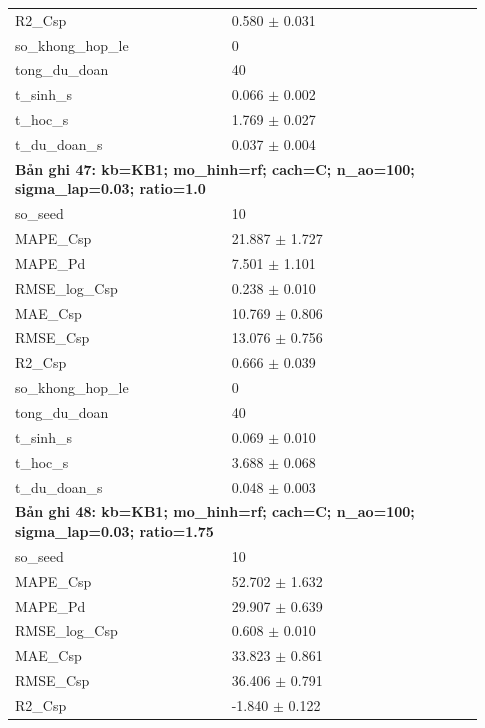 \begin{longtable}{p{0.43\linewidth}p{0.50\linewidth}}
R2\_\allowbreak Csp & 0.580 $\pm$ 0.031 \\
so\_\allowbreak khong\_\allowbreak hop\_\allowbreak le & 0 \\
tong\_\allowbreak du\_\allowbreak doan & 40 \\
t\_\allowbreak sinh\_\allowbreak s & 0.066 $\pm$ 0.002 \\
t\_\allowbreak hoc\_\allowbreak s & 1.769 $\pm$ 0.027 \\
t\_\allowbreak du\_\allowbreak doan\_\allowbreak s & 0.037 $\pm$ 0.004 \\
\midrule
\multicolumn{2}{p{0.95\linewidth}}{\textbf{Bản ghi 47: kb=KB1; mo\_hinh=rf; cach=C; n\_ao=100; sigma\_lap=0.03; ratio=1.0}} \\
so\_\allowbreak seed & 10 \\
MAPE\_\allowbreak Csp & 21.887 $\pm$ 1.727 \\
MAPE\_\allowbreak Pd & 7.501 $\pm$ 1.101 \\
RMSE\_\allowbreak log\_\allowbreak Csp & 0.238 $\pm$ 0.010 \\
MAE\_\allowbreak Csp & 10.769 $\pm$ 0.806 \\
RMSE\_\allowbreak Csp & 13.076 $\pm$ 0.756 \\
R2\_\allowbreak Csp & 0.666 $\pm$ 0.039 \\
so\_\allowbreak khong\_\allowbreak hop\_\allowbreak le & 0 \\
tong\_\allowbreak du\_\allowbreak doan & 40 \\
t\_\allowbreak sinh\_\allowbreak s & 0.069 $\pm$ 0.010 \\
t\_\allowbreak hoc\_\allowbreak s & 3.688 $\pm$ 0.068 \\
t\_\allowbreak du\_\allowbreak doan\_\allowbreak s & 0.048 $\pm$ 0.003 \\
\midrule
\multicolumn{2}{p{0.95\linewidth}}{\textbf{Bản ghi 48: kb=KB1; mo\_hinh=rf; cach=C; n\_ao=100; sigma\_lap=0.03; ratio=1.75}} \\
so\_\allowbreak seed & 10 \\
MAPE\_\allowbreak Csp & 52.702 $\pm$ 1.632 \\
MAPE\_\allowbreak Pd & 29.907 $\pm$ 0.639 \\
RMSE\_\allowbreak log\_\allowbreak Csp & 0.608 $\pm$ 0.010 \\
MAE\_\allowbreak Csp & 33.823 $\pm$ 0.861 \\
RMSE\_\allowbreak Csp & 36.406 $\pm$ 0.791 \\
R2\_\allowbreak Csp & -1.840 $\pm$ 0.122 \\

\end{longtable}
